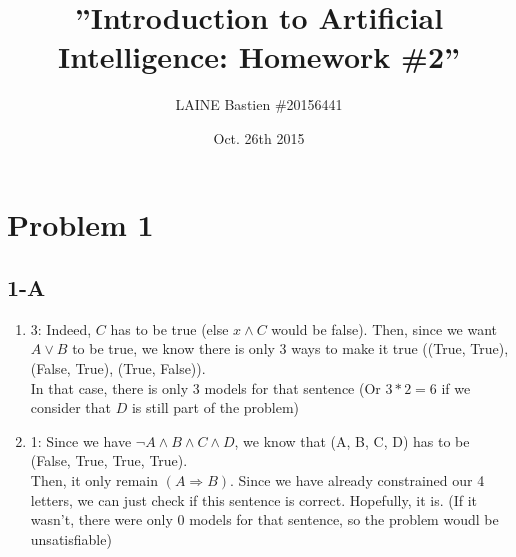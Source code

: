 \documentclass{article}
\begin{document}
    \title{\textbf{''Introduction to Artificial Intelligence: Homework \#2''}}
    \author{LAINE Bastien \#20156441}
    \date{Oct. 26th 2015}
    \maketitle
    \tableofcontents

    \newpage

    \section{Problem 1}
        \subsection{1-A}
            \begin{enumerate}
                \item 3: Indeed, $C$ has to be true (else $x\land C$ would be false). Then, since we want $A\lor B$ to be true, we know there is only 3 ways to make it true ((True, True), (False, True), (True, False)).\\
                    In that case, there is only 3 models for that sentence (Or $3*2=6$ if we consider that $D$ is still part of the problem)
                \item 1: Since we have $\lnot A\land B\land C\land D$, we know that (A, B, C, D) has to be (False, True, True, True).\\
                    Then, it only remain $(A\Rightarrow B)$. Since we have already constrained our 4 letters, we can just check if this sentence is correct. Hopefully, it is. (If it wasn't, there were only 0 models for that sentence, so the problem woudl be unsatisfiable)
            \end{enumerate}
\end{document}
